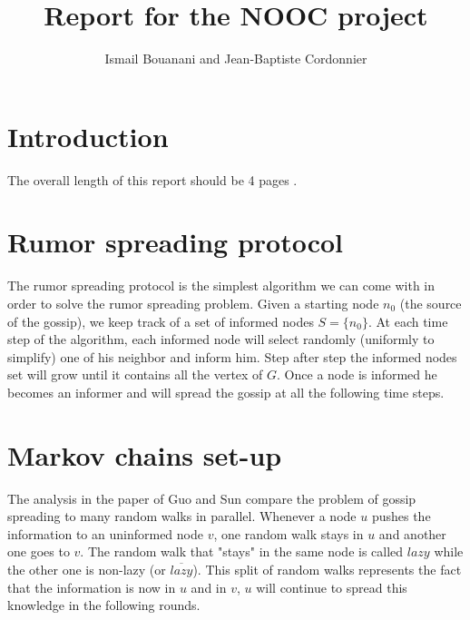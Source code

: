 \documentclass[10pt,journal,a4paper]{IEEEtran}
\begin{document}
%
\title{Report for the NOOC project}
\author{Ismail Bouanani and Jean-Baptiste Cordonnier}
%
% 


\maketitle
\IEEEdisplaynotcompsoctitleabstractindextext

\section{Introduction}

The overall length of this report should be 4 pages . 


\section{Rumor spreading protocol}

The rumor spreading protocol is the simplest algorithm we can come with in order to solve the rumor spreading problem. Given a starting node $n_0$ (the source of the gossip), we keep track of a set of informed nodes $S = \{n_0\}$. At each time step of the algorithm, each informed node will select randomly (uniformly to simplify) one of his neighbor and inform him. Step after step the informed nodes set will grow until it contains all the vertex of $G$. Once a node is informed he becomes an informer and will spread the gossip at all the following time steps.


\section{Markov chains set-up}

The analysis in the paper of Guo and Sun \cite{GuoSun} compare the problem of gossip spreading to many random walks in parallel. Whenever a node $u$ pushes the information to an uninformed node $v$, one random walk stays in $u$ and another one goes to $v$. The random walk that "stays" in the same node is called $lazy$ while the other one is non-lazy (or $\overline{lazy}$). This split of random walks represents the fact that the information is now in $u$ and in $v$, $u$ will continue to spread this knowledge in the following rounds.
\end{document}
